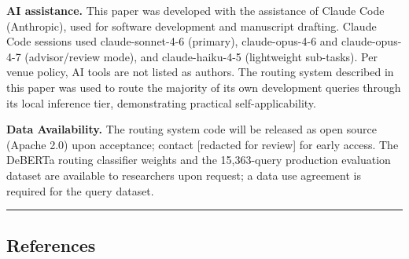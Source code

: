 \textbf{AI assistance.} This paper was developed with the assistance of Claude Code (Anthropic), used for software development and manuscript drafting. Claude Code sessions used claude-sonnet-4-6 (primary), claude-opus-4-6 and claude-opus-4-7 (advisor/review mode), and claude-haiku-4-5 (lightweight sub-tasks). Per venue policy, AI tools are not listed as authors. The routing system described in this paper was used to route the majority of its own development queries through its local inference tier, demonstrating practical self-applicability.

\textbf{Data Availability.} The routing system code will be released as open source (Apache 2.0) upon acceptance; contact {[}redacted for review{]} for early access. The DeBERTa routing classifier weights and the 15,363-query production evaluation dataset are available to researchers upon request; a data use agreement is required for the query dataset.

\begin{center}\rule{0.5\linewidth}{0.5pt}\end{center}

\subsection{References}\label{references}

